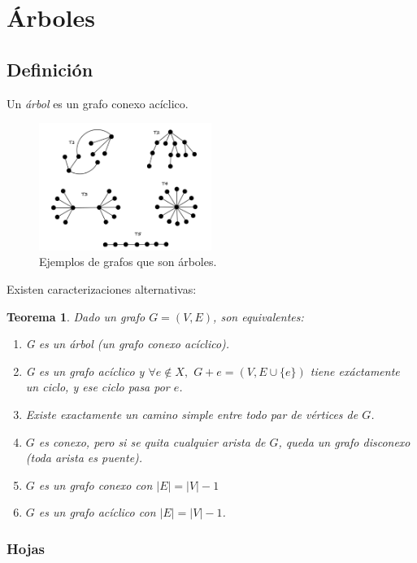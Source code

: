 \documentclass[a4paper]{report}
\newtheorem*{theorem*}{Teorema}
\begin{document}
\section{Árboles}

\subsection{Definición}

Un \textit{árbol} es un grafo conexo acíclico.

\begin{figure}[H]
    \centering
    \includegraphics*[width=0.5\textwidth]{ejemplos_arboles.png}
    \caption*{Ejemplos de grafos que son árboles.}
\end{figure}

Existen caracterizaciones alternativas:

\begin{theorem*}
    Dado un grafo $G = (V, E)$, son equivalentes:
    \begin{enumerate}
        \item G es un árbol (un grafo conexo acíclico).
        \item G es un grafo acíclico y $\forall e \notin X,$ $G + e = (V, E \cup \{e\})$ tiene exáctamente un ciclo, y ese ciclo pasa por $e$.
        \item Existe exactamente un camino simple entre todo par de vértices de $G$.
        \item $G$ es conexo, pero si se quita cualquier arista de $G$, queda un grafo disconexo (toda arista es puente).
        \item $G$ es un grafo conexo con $|E| = |V| - 1$
        \item $G$ es un grafo acíclico con $|E| = |V| - 1$.
    \end{enumerate}
\end{theorem*}


\subsubsection{Hojas}
\end{document}
